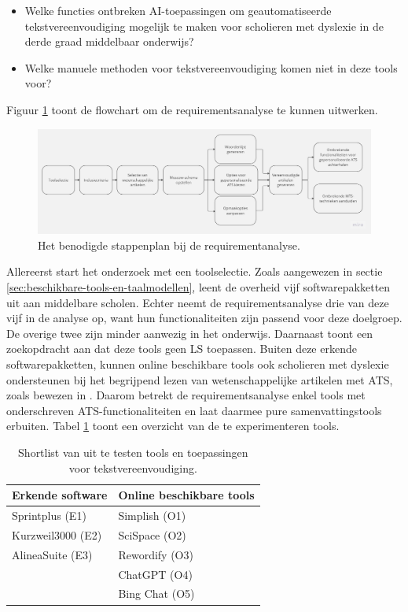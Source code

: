 \begin{itemize}
	\item Welke functies ontbreken AI-toepassingen om geautomatiseerde tekstvereenvoudiging mogelijk te maken voor scholieren met dyslexie in de derde graad middelbaar onderwijs?
	\item Welke manuele methoden voor tekstvereenvoudiging komen niet in deze tools voor?
\end{itemize}

Figuur \ref{img:flowchart-requirementsanalyse} toont de flowchart om de requirementsanalyse te kunnen uitwerken.

\begin{figure}[H]
	\includegraphics[width=\linewidth]{img/flowchart-requirementsanalyse.jpg}
	\caption{Het benodigde stappenplan bij de requirementanalyse.}
	\label{img:flowchart-requirementsanalyse}
\end{figure}

Allereerst start het onderzoek met een toolselectie. Zoals aangewezen in sectie \ref{sec:beschikbare-tools-en-taalmodellen}, leent de overheid vijf softwarepakketten uit aan middelbare scholen. Echter neemt de requirementsanalyse drie van deze vijf in de analyse op, want hun functionaliteiten zijn passend voor deze doelgroep. De overige twee zijn minder aanwezig in het onderwijs. Daarnaast toont een zoekopdracht aan dat deze tools geen LS toepassen. Buiten deze erkende softwarepakketten, kunnen online beschikbare tools ook scholieren met dyslexie ondersteunen bij het begrijpend lezen van wetenschappelijke artikelen met ATS, zoals bewezen in \textcite{Bingel2018}. Daarom betrekt de requirementsanalyse enkel tools met onderschreven ATS-functionaliteiten en laat daarmee pure samenvattingstools erbuiten. Tabel \ref{table:shortlist-tools} toont een overzicht van de te experimenteren tools.

\begin{center}
	\begin{table}[H]
		\begin{tabular}{ | m{6cm} | m{6cm} | } 
			\hline
			\textbf{Erkende software} & \textbf{Online beschikbare tools} \\
			\hline
			Sprintplus (E1) & Simplish (O1) \\
			Kurzweil3000 (E2) & SciSpace (O2) \\ 
			AlineaSuite (E3) & Rewordify (O3) \\
			& ChatGPT (O4) \\
			& Bing Chat (O5) \\
			\hline
		\end{tabular}
		\caption{Shortlist van uit te testen tools en toepassingen voor tekstvereenvoudiging.}
		\label{table:shortlist-tools}	
	\end{table}
\end{center}

